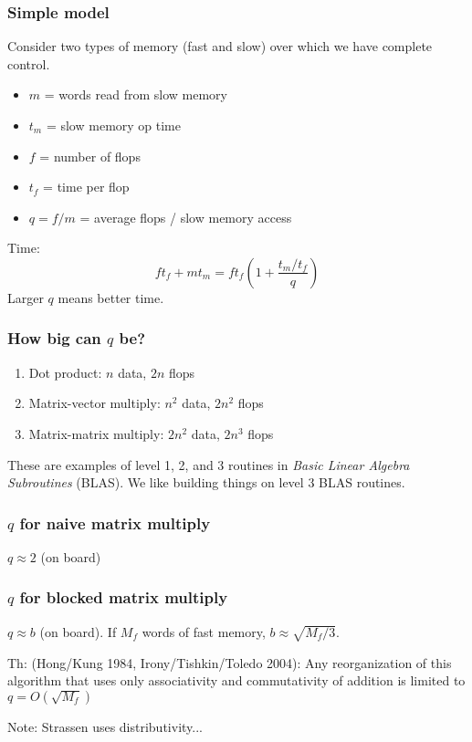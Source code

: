 \documentclass{beamer}
\begin{document}
\begin{frame}
  \frametitle{Simple model}

  Consider two types of memory (fast and slow) over which we have
  complete control.
  \begin{itemize}
  \item $m$ = words read from slow memory
  \item $t_m$ = slow memory op time
  \item $f$ = number of flops
  \item $t_f$ = time per flop
  \item $q = f/m$ = average flops / slow memory access
  \end{itemize}
  Time:
  \[
    f t_f + m t_m = f t_f \left( 1 + \frac{t_m/t_f}{q} \right)
  \]
  Larger $q$ means better time.
\end{frame}


\begin{frame}
  \frametitle{How big can $q$ be?}

  \begin{enumerate}
  \item Dot product: $n$ data, $2n$ flops
  \item Matrix-vector multiply: $n^2$ data, $2n^2$ flops
  \item Matrix-matrix multiply: $2n^2$ data, $2n^3$ flops
  \end{enumerate}
  These are examples of level 1, 2, and 3 routines in
  {\em Basic Linear Algebra Subroutines} (BLAS).
  We like building things on level 3 BLAS routines.

\end{frame}


\begin{frame}
  \frametitle{$q$ for naive matrix multiply}

  $q \approx 2$ (on board)
\end{frame}

\begin{frame}
  \frametitle{$q$ for blocked matrix multiply}

  $q \approx b$ (on board).  If $M_f$ words of fast memory,
  $b \approx \sqrt{M_f/3}$.

\vspace{1cm}
  Th: (Hong/Kung 1984, Irony/Tishkin/Toledo 2004):
  Any reorganization of this algorithm that uses only associativity
  and commutativity of addition is limited to $q = O(\sqrt{M_f})$

\vspace{1cm}
  Note: Strassen uses distributivity...
\end{frame}
\end{document}

